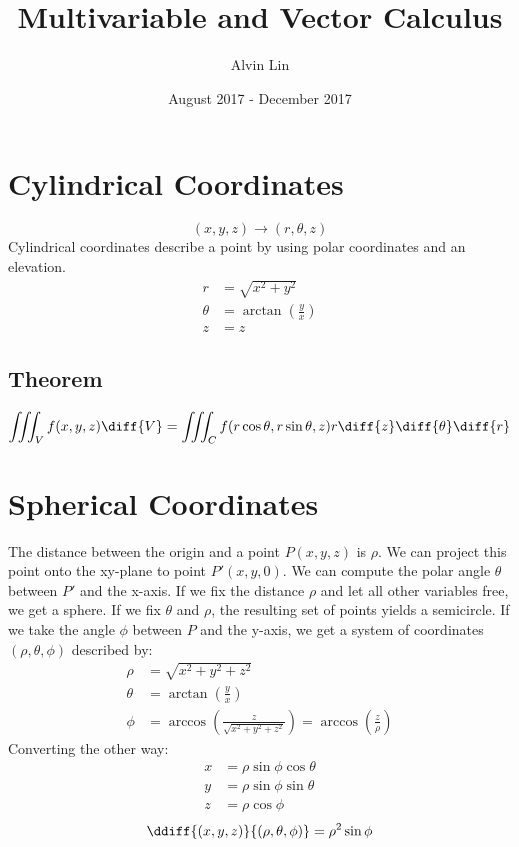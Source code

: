 \documentclass{math}
\title{Multivariable and Vector Calculus}
\author{Alvin Lin}
\date{August 2017 - December 2017}
\begin{document}
\maketitle

\section*{Cylindrical Coordinates}
\[ (x,y,z)\to(r,\theta,z) \]
Cylindrical coordinates describe a point by using polar coordinates and an
elevation.
\begin{align*}
  r &= \sqrt{x^2+y^2} \\
  \theta &= \arctan(\frac{y}{x}) \\
  z &= z
\end{align*}

\subsection*{Theorem}
\[ \iiint_{V}f(x,y,z)\diff{V} =
  \iiint_{C}f(r\cos\theta,r\sin\theta,z)r\diff{z}\diff{\theta}\diff{r} \]

\section*{Spherical Coordinates}
The distance between the origin and a point \( P(x,y,z) \) is \( \rho \). We
can project this point onto the xy-plane to point \( P'(x,y,0) \). We can
compute the polar angle \( \theta \) between \( P' \) and the x-axis. If we
fix the distance \( \rho \) and let all other variables free, we get a sphere.
If we fix \( \theta \) and \( \rho \), the resulting set of points yields a
semicircle. If we take the angle \( \phi \) between \( P \) and the y-axis,
we get a system of coordinates \( (\rho,\theta,\phi) \) described by:
\begin{align*}
  \rho &= \sqrt{x^2+y^2+z^2} \\
  \theta &= \arctan(\frac{y}{x}) \\
  \phi &= \arccos\left(\frac{z}{\sqrt{x^2+y^2+z^2}}\right) =
    \arccos\left(\frac{z}{\rho}\right)
\end{align*}
Converting the other way:
\begin{align*}
  x &= \rho\sin\phi\cos\theta \\
  y &= \rho\sin\phi\sin\theta \\
  z &= \rho\cos\phi
\end{align*}
\[ \ddiff{(x,y,z)}{(\rho,\theta,\phi)} = \rho^2\sin\phi \]
\end{document}
